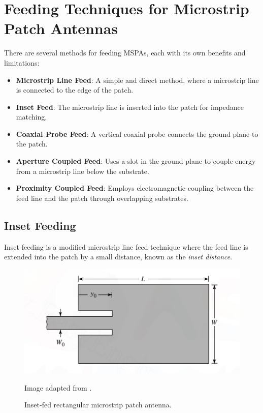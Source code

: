 \section{Feeding Techniques for Microstrip Patch Antennas}

There are several methods for feeding MSPAs, each with its own benefits and limitations:

\begin{itemize}
    \item \textbf{Microstrip Line Feed}: A simple and direct method, where a microstrip line is connected to the edge of the patch.
    \item \textbf{Inset Feed}: The microstrip line is inserted into the patch for impedance matching.
    \item \textbf{Coaxial Probe Feed}: A vertical coaxial probe connects the ground plane to the patch.
    \item \textbf{Aperture Coupled Feed}: Uses a slot in the ground plane to couple energy from a microstrip line below the substrate.
    \item \textbf{Proximity Coupled Feed}: Employs electromagnetic coupling between the feed line and the patch through overlapping substrates.
\end{itemize}

\subsection*{Inset Feeding}

Inset feeding is a modified microstrip line feed technique where the feed line is extended into the patch by a small distance, known as the \textit{inset distance}.

\begin{figure}[H]
    \centering
    \includegraphics[width=1.0\textwidth]{figures/inset.png}
    \caption{Inset-fed rectangular microstrip patch antenna.}
    \small Image adapted from \cite{balanis}.
    \label{fig:inset-feed}
\end{figure}

